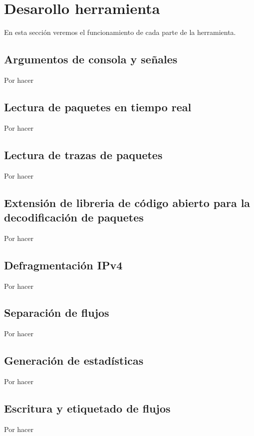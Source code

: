 \section{Desarollo herramienta}

En esta sección veremos el funcionamiento de cada parte de la herramienta. 



\subsection{Argumentos de consola y señales}

Por hacer

\subsection{Lectura de paquetes en tiempo real}

Por hacer

\subsection{Lectura de trazas de paquetes}

Por hacer

\subsection{Extensión de libreria de código abierto para la decodificación de paquetes}

Por hacer

\subsection{Defragmentación IPv4}

Por hacer

\subsection{Separación de flujos}

Por hacer

\subsection{Generación de estadísticas}

Por hacer

\subsection{Escritura y etiquetado de flujos}

Por hacer

